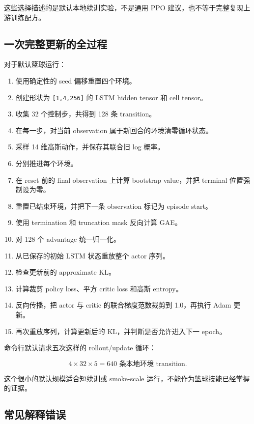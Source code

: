 \documentclass[
  chinese,
  11pt,
  letterpaper,
]{article}
\providecommand{\tightlist}{%
  \setlength{\itemsep}{0pt}\setlength{\parskip}{0pt}}
\begin{document}
这些选择描述的是默认本地续训实验，不是通用 PPO
建议，也不等于完整复现上游训练配方。

\subsection{一次完整更新的全过程}\label{ux4e00ux6b21ux5b8cux6574ux66f4ux65b0ux7684ux5168ux8fc7ux7a0b}

对于默认篮球运行：

\begin{enumerate}
\def\labelenumi{\arabic{enumi}.}
\tightlist
\item
  使用确定性的 seed 偏移重置四个环境。
\item
  创建形状为 \texttt{{[}1,4,256{]}} 的 LSTM hidden tensor 和 cell
  tensor。
\item
  收集 32 个控制步，共得到 128 条 transition。
\item
  在每一步，对当前 observation 属于新回合的环境清零循环状态。
\item
  采样 14 维高斯动作，并保存其联合旧 log 概率。
\item
  分别推进每个环境。
\item
  在 reset 前的 final observation 上计算 bootstrap value，并把 terminal
  位置强制设为零。
\item
  重置已结束环境，并把下一条 observation 标记为 episode start。
\item
  使用 termination 和 truncation mask 反向计算 GAE。
\item
  对 128 个 advantage 统一归一化。
\item
  从已保存的初始 LSTM 状态重放整个 actor 序列。
\item
  检查更新前的 approximate KL。
\item
  计算裁剪 policy loss、平方 critic loss 和高斯 entropy。
\item
  反向传播，把 actor 与 critic 的联合梯度范数裁剪到 1.0，再执行 Adam
  更新。
\item
  再次重放序列，计算更新后的 KL，并判断是否允许进入下一 epoch。
\end{enumerate}

命令行默认请求五次这样的 rollout/update 循环：

\[
4\times32\times5=640
\text{ 条本地环境 transition}.
\]

这个很小的默认规模适合短续训或 smoke-scale
运行，不能作为篮球技能已经掌握的证据。

\subsection{常见解释错误}\label{ux5e38ux89c1ux89e3ux91caux9519ux8bef}
\end{document}
